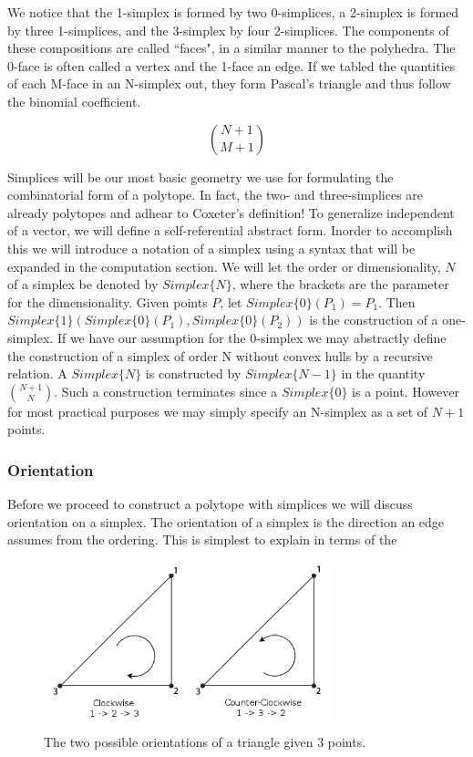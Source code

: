 We notice that the 1-simplex is formed by two 0-simplices, a 2-simplex is formed
by three 1-simplices, and the 3-simplex by four 2-simplices. The components of
these compositions are called ``faces", in a similar manner to the polyhedra. The 0-face is often called a vertex
and the 1-face an edge. If we tabled the quantities of each M-face in an
N-simplex out, they form
Pascal's triangle and thus follow the binomial coefficient.

\begin{equation}
{N+1}\choose{M+1}
\end{equation}

Simplices will be our most basic geometry we use for formulating the combinatorial
form of a polytope. In fact, the two- and three-simplices are already
polytopes and adhear to Coxeter's definition! To generalize independent of
a vector, we will define a self-referential abstract form. Inorder to
accomplish this we will introduce a notation of a simplex using a syntax
that will be expanded in the computation section. We will let the order
or dimensionality, $N$ of
a simplex be denoted by $Simplex\{N\}$, where the brackets are the parameter
for the dimensionality. Given points $P$, let $Simplex\{0\}(P_1) = P_1$.
Then $Simplex\{1\}(Simplex\{0\}(P_1), Simplex\{0\}(P_2))$ is the construction
of a one-simplex. If we have our assumption for the 0-simplex we may
abstractly define the construction of a simplex of order N without convex
hulls by a recursive relation. A $Simplex\{N\}$ is constructed by
$Simplex\{N-1\}$ in the quantity ${N+1}\choose{N}$.
Such a construction terminates since
a $Simplex\{0\}$ is a point. However for most practical purposes
we may simply specify an N-simplex as a set of $N+1$ points.


\subsubsection{Orientation}

Before we proceed to construct a polytope with simplices we will
discuss orientation on a simplex. The orientation of a simplex is the
direction an edge assumes from the ordering. This is simplest to
explain in terms of the 

\begin{figure}[h!]
  \centering
    \includegraphics[width=0.75\textwidth]{img/Winding_order.png}
  \caption{The two possible orientations of a triangle given 3 points.}
  \label{fig:tri_orientation}
\end{figure}



